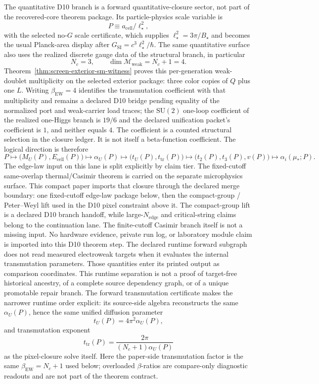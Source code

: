 \documentclass[11pt]{article}
\newcommand{\SU}{\mathrm{SU}}
\begin{document}
The quantitative D10 branch is a forward quantitative-closure sector, not part of the recovered-core theorem package. Its particle-physics scale variable is
\[
P \equiv a_{\mathrm{cell}}/\ell_\star^2,
\]
with the selected no-\(G\) scale certificate, which supplies \(\ell_\star^2=3\pi/B_\star\) and
becomes the usual Planck-area display after \(G_{\mathrm{SI}}=c^3\ell_\star^2/\hbar\). The same quantitative
surface also uses the realized discrete gauge data of the structural branch, in particular
\[
N_c=3,
\qquad
\dim\mathcal M_{\mathrm{weak}}=N_c+1=4.
\]
Theorem~\ref{thm:screen-exterior-sm-witness} proves this per-generation
weak-doublet multiplicity on the selected exterior package: three color copies
of \(Q\) plus one \(L\). Writing \(\beta_{\mathrm{EW}}=4\) identifies the
transmutation coefficient with that multiplicity and remains a declared D10
bridge pending equality of the normalized port and weak-carrier load traces;
the \(\SU(2)\) one-loop
coefficient of the realized one-Higgs branch is \(19/6\) and the declared unification packet's
coefficient is \(1\), and neither equals \(4\). The coefficient is a counted structural selection
in the closure ledger. It is not itself a beta-function coefficient.
The logical direction is therefore
\[
P
\longmapsto
\bigl(M_U(P),E_{\mathrm{cell}}(P)\bigr)
\longmapsto
\alpha_U(P)
\longmapsto
\bigl(t_U(P),t_{\mathrm{tr}}(P)\bigr)
\longmapsto
\bigl(t_2(P),t_3(P),v(P)\bigr)
\longmapsto
\alpha_i(\mu_\ast;P).
\]
The edge-law input on this lane is split explicitly by claim tier. The fixed-cutoff
same-overlap thermal/Casimir theorem is carried on the separate microphysics surface. This
compact paper imports that closure through the declared merge boundary: one fixed-cutoff
edge-law package below, then the compact-group / Peter--Weyl lift used in the D10 pixel
constraint above it. The compact-group lift is a declared D10 branch handoff, while
large-\(N_{\mathrm{edge}}\) and critical-string claims belong to the continuation lane. The
finite-cutoff Casimir branch itself is not a missing input. No hardware evidence, private run
log, or laboratory module claim is imported into this D10 theorem step.
The declared runtime forward subgraph does not read measured electroweak targets when it evaluates
the internal transmutation parameters.  Those quantities enter its printed output as comparison
coordinates.  This runtime separation is not a proof of target-free historical ancestry,
of a complete source dependency graph, or of a unique promotable repair branch.
The forward transmutation certificate makes the narrower runtime order explicit: its source-side
algebra reconstructs the same \(\alpha_U(P)\), hence the same unified diffusion parameter
\[
t_U(P)=4\pi^2\alpha_U(P),
\]
and transmutation exponent
\[
t_{\mathrm{tr}}(P)=\frac{2\pi}{(N_c+1)\alpha_U(P)}
\]
as the pixel-closure solve itself. Here the paper-side transmutation factor is the same
\(\beta_{\mathrm{EW}}=N_c+1\) used below; overloaded \(\beta\)-ratios are compare-only
diagnostic readouts and are not part of the theorem contract.
\end{document}
